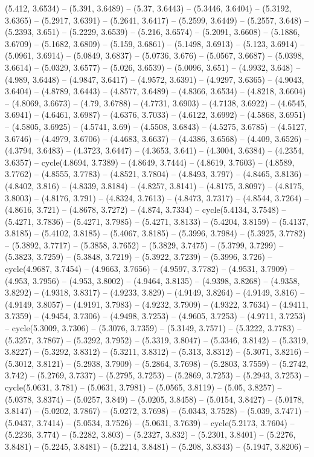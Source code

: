 (5.412, 3.6534) -- (5.391, 3.6489) -- (5.37, 3.6443) -- (5.3446, 3.6404) -- (5.3192, 3.6365) -- (5.2917, 3.6391) -- (5.2641, 3.6417) -- (5.2599, 3.6449) -- (5.2557, 3.648) -- (5.2393, 3.651) -- (5.2229, 3.6539) -- (5.216, 3.6574) -- (5.2091, 3.6608) -- (5.1886, 3.6709) -- (5.1682, 3.6809) -- (5.159, 3.6861) -- (5.1498, 3.6913) -- (5.123, 3.6914) -- (5.0961, 3.6914) -- (5.0849, 3.6837) -- (5.0736, 3.676) -- (5.0567, 3.6687) -- (5.0398, 3.6614) -- (5.0329, 3.6577) -- (5.026, 3.6539) -- (5.0096, 3.651) -- (4.9932, 3.648) -- (4.989, 3.6448) -- (4.9847, 3.6417) -- (4.9572, 3.6391) -- (4.9297, 3.6365) -- (4.9043, 3.6404) -- (4.8789, 3.6443) -- (4.8577, 3.6489) -- (4.8366, 3.6534) -- (4.8218, 3.6604) -- (4.8069, 3.6673) -- (4.79, 3.6788) -- (4.7731, 3.6903) -- (4.7138, 3.6922) -- (4.6545, 3.6941) -- (4.6461, 3.6987) -- (4.6376, 3.7033) -- (4.6122, 3.6992) -- (4.5868, 3.6951) -- (4.5805, 3.6925) -- (4.5741, 3.69) -- (4.5508, 3.6843) -- (4.5275, 3.6785) -- (4.5127, 3.6746) -- (4.4979, 3.6706) -- (4.4683, 3.6637) -- (4.4386, 3.6568) -- (4.409, 3.6526) -- (4.3794, 3.6483) -- (4.3723, 3.6447) -- (4.3653, 3.641) -- (4.3004, 3.6384) -- (4.2354, 3.6357) -- cycle(4.8694, 3.7389) -- (4.8649, 3.7444) -- (4.8619, 3.7603) -- (4.8589, 3.7762) -- (4.8555, 3.7783) -- (4.8521, 3.7804) -- (4.8493, 3.797) -- (4.8465, 3.8136) -- (4.8402, 3.816) -- (4.8339, 3.8184) -- (4.8257, 3.8141) -- (4.8175, 3.8097) -- (4.8175, 3.8003) -- (4.8176, 3.791) -- (4.8324, 3.7613) -- (4.8473, 3.7317) -- (4.8544, 3.7264) -- (4.8616, 3.721) -- (4.8678, 3.7272) -- (4.874, 3.7334) -- cycle(5.4134, 3.7548) -- (5.4271, 3.7836) -- (5.4271, 3.7985) -- (5.4271, 3.8133) -- (5.4204, 3.8159) -- (5.4137, 3.8185) -- (5.4102, 3.8185) -- (5.4067, 3.8185) -- (5.3996, 3.7984) -- (5.3925, 3.7782) -- (5.3892, 3.7717) -- (5.3858, 3.7652) -- (5.3829, 3.7475) -- (5.3799, 3.7299) -- (5.3823, 3.7259) -- (5.3848, 3.7219) -- (5.3922, 3.7239) -- (5.3996, 3.726) -- cycle(4.9687, 3.7454) -- (4.9663, 3.7656) -- (4.9597, 3.7782) -- (4.9531, 3.7909) -- (4.953, 3.7956) -- (4.953, 3.8002) -- (4.9464, 3.8135) -- (4.9398, 3.8268) -- (4.9358, 3.8292) -- (4.9318, 3.8317) -- (4.9233, 3.829) -- (4.9149, 3.8264) -- (4.9149, 3.816) -- (4.9149, 3.8057) -- (4.9191, 3.7983) -- (4.9232, 3.7909) -- (4.9322, 3.7634) -- (4.9411, 3.7359) -- (4.9454, 3.7306) -- (4.9498, 3.7253) -- (4.9605, 3.7253) -- (4.9711, 3.7253) -- cycle(5.3009, 3.7306) -- (5.3076, 3.7359) -- (5.3149, 3.7571) -- (5.3222, 3.7783) -- (5.3257, 3.7867) -- (5.3292, 3.7952) -- (5.3319, 3.8047) -- (5.3346, 3.8142) -- (5.3319, 3.8227) -- (5.3292, 3.8312) -- (5.3211, 3.8312) -- (5.313, 3.8312) -- (5.3071, 3.8216) -- (5.3012, 3.8121) -- (5.2938, 3.7909) -- (5.2864, 3.7698) -- (5.2803, 3.7559) -- (5.2742, 3.742) -- (5.2769, 3.7337) -- (5.2795, 3.7253) -- (5.2869, 3.7253) -- (5.2943, 3.7253) -- cycle(5.0631, 3.781) -- (5.0631, 3.7981) -- (5.0565, 3.8119) -- (5.05, 3.8257) -- (5.0378, 3.8374) -- (5.0257, 3.849) -- (5.0205, 3.8458) -- (5.0154, 3.8427) -- (5.0178, 3.8147) -- (5.0202, 3.7867) -- (5.0272, 3.7698) -- (5.0343, 3.7528) -- (5.039, 3.7471) -- (5.0437, 3.7414) -- (5.0534, 3.7526) -- (5.0631, 3.7639) -- cycle(5.2173, 3.7604) -- (5.2236, 3.774) -- (5.2282, 3.803) -- (5.2327, 3.832) -- (5.2301, 3.8401) -- (5.2276, 3.8481) -- (5.2245, 3.8481) -- (5.2214, 3.8481) -- (5.208, 3.8343) -- (5.1947, 3.8206) -- 